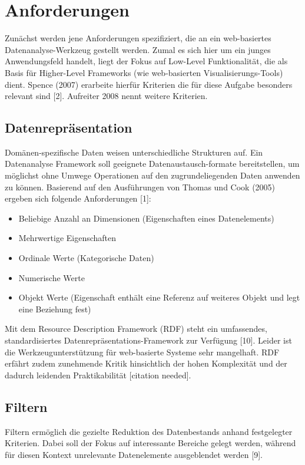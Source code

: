 \documentclass[runningheads]{llncs}
\begin{document}
\section{Anforderungen}


Zunächst werden jene Anforderungen spezifiziert, die an ein web-basiertes Datenanalyse-Werkzeug gestellt werden. Zumal es sich hier um ein junges Anwendungsfeld handelt, liegt der Fokus auf Low-Level Funktionalität, die als Basis für Higher-Level Frameworks (wie web-basierten Visualisierungs-Tools) dient. Spence (2007) erarbeite hierfür Kriterien die für diese Aufgabe besonders relevant sind [2]. Aufreiter 2008 nennt weitere Kriterien.

\subsection{Datenrepräsentation}


Domänen-spezifische Daten weisen unterschiedliche Strukturen auf. Ein Datenanalyse Framework soll geeignete Datenaustausch-formate bereitstellen, um möglichst ohne Umwege Operationen auf den zugrundeliegenden Daten anwenden zu können. Basierend auf den Ausführungen von Thomas und Cook (2005) ergeben sich folgende Anforderungen [1]:\begin{itemize}
\item Beliebige Anzahl an Dimensionen (Eigenschaften eines Datenelements)\\

\item Mehrwertige Eigenschaften
\item Ordinale Werte (Kategorische Daten)
\item Numerische Werte
\item Objekt Werte (Eigenschaft enthält eine Referenz auf weiteres Objekt und legt eine Beziehung fest)\end{itemize}
Mit dem Resource Description Framework (RDF) steht ein umfassendes, standardisiertes Datenrepräsentations-Framework zur Verfügung [10]. Leider ist die Werkzeugunterstützung für web-basierte Systeme sehr mangelhaft. RDF erfährt zudem zunehmende Kritik hinsichtlich der hohen Komplexität und der dadurch leidenden Praktikabilität [citation needed].

\subsection{Filtern}


Filtern ermöglich die gezielte Reduktion des Datenbestands anhand festgelegter Kriterien. Dabei soll der Fokus auf interessante Bereiche gelegt werden, während für diesen Kontext unrelevante Datenelemente ausgeblendet werden [9].
\end{document}
